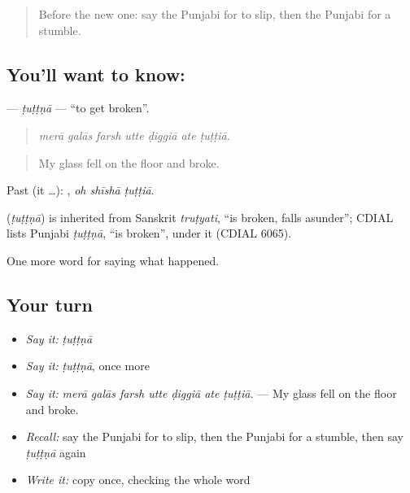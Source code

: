 \label{lesson:PA-C310-tuttna}



\begin{quote}
Before the new one: say the Punjabi for to slip, then the Punjabi for a stumble.
\end{quote}

\subsection*{You'll want to know: }
\textbf{} — \emph{ṭuṭṭṇā} — \textquotedblleft{}to get broken\textquotedblright{}.

\begin{quote}
      
\end{quote}

\begin{quote}
\emph{merā galās farsh utte ḍiggiā ate ṭuṭṭiā.}
\end{quote}

\begin{quote}
My glass fell on the floor and broke.
\end{quote}

Past (it …):   , \emph{oh shīshā ṭuṭṭiā}.

\begin{cousinweb}
\textbf{} (\emph{ṭuṭṭṇā}) is inherited from Sanskrit \emph{truṭyati}, \textquotedblleft{}is broken, falls asunder\textquotedblright{}; CDIAL lists Punjabi \emph{ṭuṭṭṇā}, \textquotedblleft{}is broken\textquotedblright{}, under it (CDIAL 6065).
\end{cousinweb}

\begin{grammarlens}[title={What you've built}]
One more word for saying what happened.
\end{grammarlens}

\subsection*{Your turn}
\begin{itemize}
\raggedright
  \item \emph{Say it:} \emph{ṭuṭṭṇā}
  \item \emph{Say it:} \emph{ṭuṭṭṇā}, once more
  \item \emph{Say it:} \emph{merā galās farsh utte ḍiggiā ate ṭuṭṭiā.} — My glass fell on the floor and broke.
  \item \emph{Recall:} say the Punjabi for to slip, then the Punjabi for a stumble, then say \emph{ṭuṭṭṇā} again
  \item \emph{Write it:} copy \textbf{} once, checking the whole word
\end{itemize}

